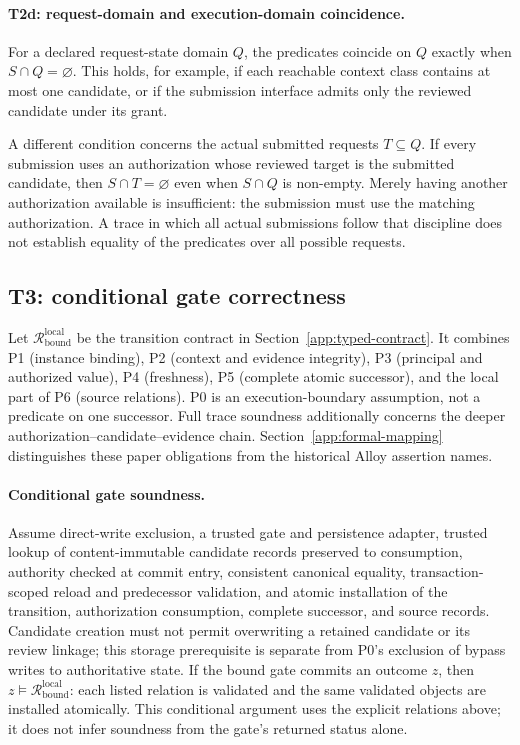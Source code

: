 \paragraph{T2d: request-domain and execution-domain coincidence.}
For a declared request-state domain $Q$, the predicates coincide on $Q$ exactly when $S\cap Q=\varnothing$. This holds, for example, if each reachable context class contains at most one candidate, or if the submission interface admits only the reviewed candidate under its grant.

A different condition concerns the actual submitted requests $T\subseteq Q$. If every submission uses an authorization whose reviewed target is the submitted candidate, then $S\cap T=\varnothing$ even when $S\cap Q$ is non-empty. Merely having another authorization available is insufficient: the submission must use the matching authorization. A trace in which all actual submissions follow that discipline does not establish equality of the predicates over all possible requests.



\subsection{T3: conditional gate correctness}
\label{app:t3}
Let $\mathcal R_{\mathrm{bound}}^{\mathrm{local}}$ be the transition contract in Section~\ref{app:typed-contract}. It combines P1 (instance binding), P2 (context and evidence integrity), P3 (principal and authorized value), P4 (freshness), P5 (complete atomic successor), and the local part of P6 (source relations). P0 is an execution-boundary assumption, not a predicate on one successor. Full trace soundness additionally concerns the deeper authorization--candidate--evidence chain. Section~\ref{app:formal-mapping} distinguishes these paper obligations from the historical Alloy assertion names.

\paragraph{Conditional gate soundness.}
Assume direct-write exclusion, a trusted gate and persistence adapter, trusted lookup of content-immutable candidate records preserved to consumption, authority checked at commit entry, consistent canonical equality, transaction-scoped reload and predecessor validation, and atomic installation of the transition, authorization consumption, complete successor, and source records. Candidate creation must not permit overwriting a retained candidate or its review linkage; this storage prerequisite is separate from P0's exclusion of bypass writes to authoritative state. If the bound gate commits an outcome $z$, then $z\models\mathcal R_{\mathrm{bound}}^{\mathrm{local}}$: each listed relation is validated and the same validated objects are installed atomically. This conditional argument uses the explicit relations above; it does not infer soundness from the gate's returned status alone.

